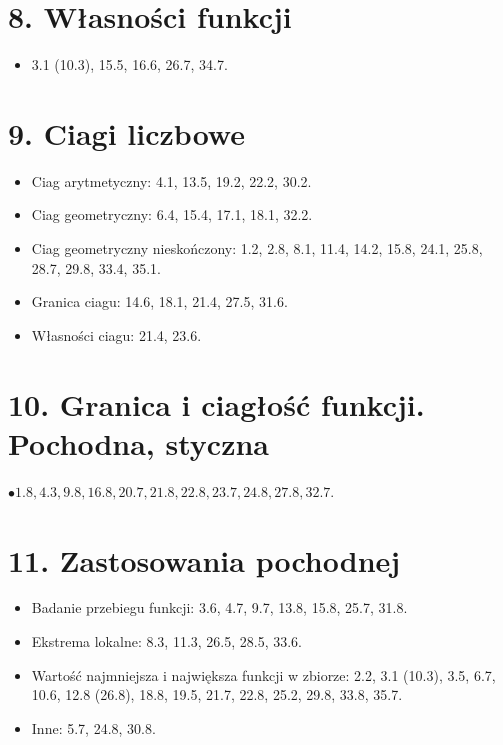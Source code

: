 \documentclass[10pt]{article}
\begin{document}
\section*{8. Własności funkcji}
\begin{itemize}
  \item 3.1 (10.3), 15.5, 16.6, 26.7, 34.7.
\end{itemize}

\section*{9. Ciagi liczbowe}
\begin{itemize}
  \item Ciag arytmetyczny: 4.1, 13.5, 19.2, 22.2, 30.2.
  \item Ciag geometryczny: 6.4, 15.4, 17.1, 18.1, 32.2.
  \item Ciag geometryczny nieskończony: 1.2, 2.8, 8.1, 11.4, 14.2, 15.8, 24.1, 25.8, 28.7, 29.8, 33.4, 35.1.
  \item Granica ciagu: 14.6, 18.1, 21.4, 27.5, 31.6.
  \item Własności ciagu: 21.4, 23.6.
\end{itemize}

\section*{10. Granica i ciagłość funkcji. Pochodna, styczna}
$\bullet 1.8,4.3,9.8,16.8,20.7,21.8,22.8,23.7,24.8,27.8,32.7$.

\section*{11. Zastosowania pochodnej}
\begin{itemize}
  \item Badanie przebiegu funkcji: 3.6, 4.7, 9.7, 13.8, 15.8, 25.7, 31.8.
  \item Ekstrema lokalne: 8.3, 11.3, 26.5, 28.5, 33.6.
  \item Wartość najmniejsza i największa funkcji w zbiorze: 2.2, 3.1 (10.3), 3.5, 6.7, 10.6, 12.8 (26.8), 18.8, 19.5, 21.7, 22.8, 25.2, 29.8, 33.8, 35.7.
  \item Inne: 5.7, 24.8, 30.8.
\end{itemize}
\end{document}
